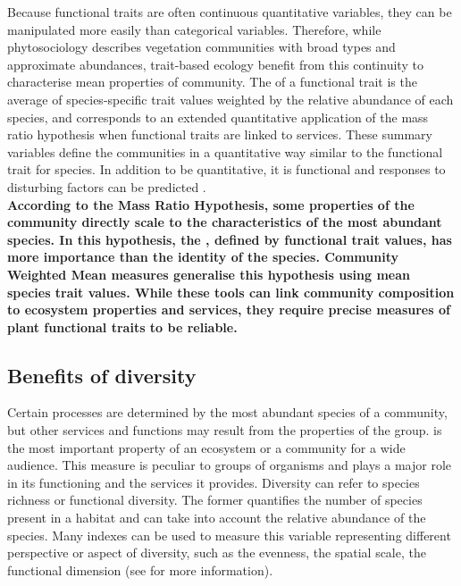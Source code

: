 Because functional traits are often continuous quantitative variables, they can be manipulated more easily than categorical variables. Therefore, while phytosociology describes vegetation communities with broad types and approximate abundances, trait-based ecology benefit from this continuity to characterise mean properties of community. The  of a functional trait is the average of species-specific trait values weighted by the relative abundance of each species, and corresponds to an extended quantitative application of the mass ratio hypothesis when functional traits are linked to services. These summary variables define the communities in a quantitative way similar to the functional trait for species. In addition to be quantitative, it is functional and responses to disturbing factors can be predicted \parencite{lavorel_predicting_2002}.\\

\textbf{According to the Mass Ratio Hypothesis, some properties of the community directly scale to the characteristics of the most abundant species. In this hypothesis, the , defined by functional trait values, has more importance than the identity of the species. Community Weighted Mean measures generalise this hypothesis using mean species trait values. While these tools can link community composition to ecosystem properties and services, they require precise measures of plant functional traits to be reliable.}

\subsection{Benefits of diversity}

Certain processes are determined by the most abundant species of a community, but other services and functions may result from the properties of the group.  is the most important property of an ecosystem or a community for a wide audience. This measure is peculiar to groups of organisms and plays a major role in its functioning and the services it provides. Diversity can refer to species richness or functional diversity. The former quantifies the number of species present in a habitat and can take into account the relative abundance of the species. Many indexes can be used to measure this variable representing different perspective or aspect of diversity, such as the evenness, the spatial scale, the functional dimension (see \citet{chalmandrier_communities_2015} for more information).

